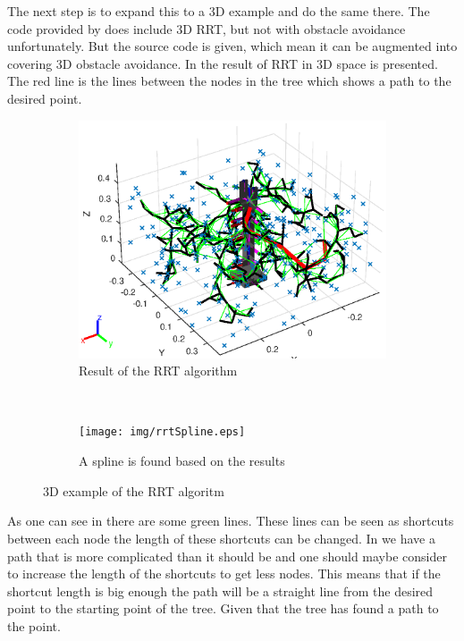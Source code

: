 The next step is to expand this to a 3D example and do the same there. The code provided by \cite{rrt} does include 3D RRT, but not with obstacle avoidance unfortunately. But the source code is given, which mean it can be augmented into covering 3D obstacle avoidance. In  the result of RRT in 3D space is presented. The red line is the lines between the nodes in the tree which shows a path to the desired point. 
\def\picsSiz{1.08}
\begin{figure}[htbp]
    \centering
    \begin{subfigure}[htbp]{0.45\textwidth}
        \centering
        \includegraphics[width = \picsSiz\linewidth]{img/rrt3dex.eps}
        \caption{Result of the RRT algorithm}
        \label{fig:rrt3dex}
    \end{subfigure}
    ~ 
    \begin{subfigure}[htbp]{0.45\textwidth}
        \centering
        \texttt{[image: img/rrtSpline.eps]}
        \caption{A spline is found based on the results}
        \label{fig:rrtSpline}
    \end{subfigure}
    \caption{3D example of the RRT algoritm}
    \label{fig:rrtsuper}
\end{figure}
 As one can see in  there are some green lines. These lines can be seen as shortcuts between each node the length of these shortcuts can be changed. In  we have a path that is more complicated than it should be and one should maybe consider to increase the length of the shortcuts to get less nodes. This means that if the shortcut length is big enough the path will be a straight line from the desired point to the starting point of the tree. Given that the tree has found a path to the point. 
 
